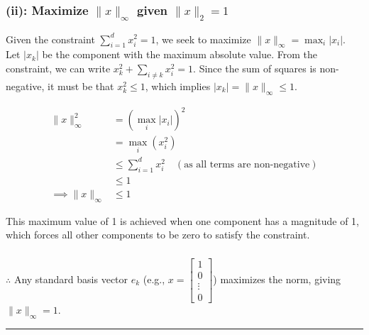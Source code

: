 \documentclass{article}
\begin{document}
\subsubsection*{(ii): Maximize $\|x\|_{\infty}$ given $\|x\|_{2}=1$}
\parbox{\textwidth}{
Given the constraint $\sum_{i=1}^d x_i^2 = 1$, we seek to maximize $\|x\|_{\infty} = \max_i |x_i|$. Let $|x_k|$ be the component with the maximum absolute value. From the constraint, we can write $x_k^2 + \sum_{i \ne k} x_i^2 = 1$. Since the sum of squares is non-negative, it must be that $x_k^2 \le 1$, which implies $|x_k| = \|x\|_{\infty} \le 1$.
}
\begin{align*}
    \|x\|_{\infty}^2 &= (\max_i |x_i|)^2 \\
    &= \max_i (x_i^2) \\
    &\le \sum_{i=1}^d x_i^2 \quad (\text{as all terms are non-negative}) \\
    &\le 1 \\
    \implies \|x\|_{\infty} &\le 1
\end{align*}
\parbox{\textwidth}{
This maximum value of 1 is achieved when one component has a magnitude of 1, which forces all other components to be zero to satisfy the constraint.
}
\subsubsection*{\normalfont}{$\therefore$ Any standard basis vector $e_k$ (e.g., $x=\begin{bmatrix} 1 \\ 0 \\ \vdots \\ 0 \end{bmatrix}$) maximizes the norm, giving $\|x\|_{\infty}=1$.}

\noindent\rule{\textwidth}{0.4pt}\\

\newpage
\end{document}
